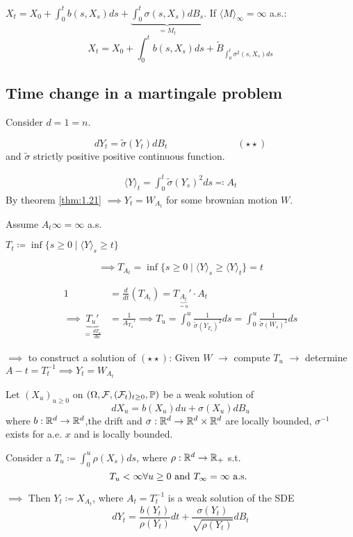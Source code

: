 $X_t=X_0+\int_0^t b(s,X_s)ds+\underbrace{\int_0^t \sigma(s,X_s)dB_s}_{=M_t}$.
If $\langle M\rangle_\infty=\infty$ a.s.:
\[X_t=X_0+\int_0^tb(s,X_s)ds+\tilde{B}_{\int_0^t \sigma^2(s,X_s)ds}\]

\subsection{Time change in a martingale problem}

Consider $d=1=n$.

\[dY_t=\tilde{\sigma}(Y_t)dB_t \hspace{3cm}(\star\star)\]
and $\tilde{\sigma}$ strictly positive positive continuous function.

\begin{align*}
    \langle Y\rangle_t=\int_0^t\tilde{\sigma}(Y_s)^2 ds\eqqcolon A_t
\end{align*}
By theorem \ref{thm:1.21} $\implies Y_t=W_{A_t}$ for some brownian motion $W$.

Assume $A_t\infty=\infty$ a.s.

$T_t\coloneqq \inf\{s\geq 0\mid \langle Y\rangle_s \geq t\}$

\[\implies T_{A_t}=\inf\{s\geq 0\mid \langle Y\rangle_s\geq \langle Y\rangle_t\}=t\]

\begin{align*}
    1&=\frac{d}{dt}\left(T_{A_t}\right)=T_{\underbrace{A_t}_{=u}}'\cdot A_t\\
    \implies \underbrace{T_u'}_{=\frac{dT_u}{du}}&=\frac{1}{A_{T_u}'} \implies T_u = \int_0^u \frac{1}{\tilde{\sigma}(Y_{T_s})^2}ds=\int_0^u \frac{1}{\tilde{\sigma}(W_s)^2}ds
\end{align*}

$\implies$ to construct a solution of $(\star\star)$: Given $W$ $\longrightarrow$ compute $T_u$ $\longrightarrow$ determine $A-t=T_t^{-1}\implies Y_t=W_{A_t}$


\begin{theorem}\label{thm:1.22}
    Let $(X_u)_{u\geq 0}$ on $(\Omega,\mathcal{F},(\mathcal{F}_t)_{t\geq 0},\mathbb{P})$ be a weak solution of 
    \[dX_u=b(X_u)du+\sigma(X_u)dB_u\]
    where $b:\mathbb{R}^d\to\mathbb{R}^d$,the drift and $\sigma:\mathbb{R}^d\to\mathbb{R}^d\times\mathbb{R}^d$ are locally bounded, 
    $\sigma^{-1}$ exists for a.e. $x$ and is locally bounded.
    
    Consider a  $T_u\coloneqq \int_0^u \rho(X_s)ds$,
    where $\rho:\mathbb{R}^d\to\mathbb{R}_+$ s.t. 
    \[T_u<\infty \forall u\geq 0\text{ and } T_\infty=\infty\text{ a.s. }\]

    $\implies$ Then $Y_t\coloneqq X_{A_t}$, where $A_t=T_t^{-1}$ is a weak 
    solution of the SDE 
    \[dY_t=\frac{b(Y_t)}{\rho(Y_t)}dt+\frac{\sigma(Y_t)}{\sqrt{\rho(Y_t)}}dB_t\]
\end{theorem}

